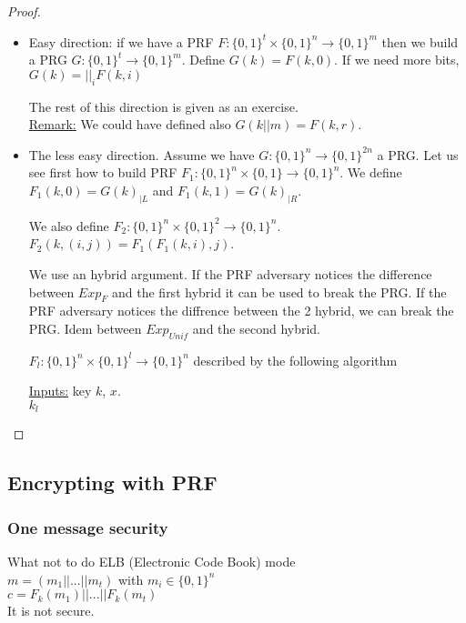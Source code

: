\documentclass{article}
\newcommand{\Rem}{\underline{Remark:} }
\newcommand{\bit}{\{0,1\}}
\begin{document}
\begin{proof}
\begin{itemize}
\item Easy direction:
if we have a PRF $F:\bit^t\times\bit^n\rightarrow\bit^m$ then we build a PRG $G:\bit^t\rightarrow\bit^m$. Define $G(k)=F(k,0)$. If we need more bits, $G(k)=||_{i}F(k,i)$

The rest of this direction is given as an exercise.\\
\Rem We could have defined also $G(k||m)=F(k,r)$.
\item The less easy direction. Assume we have $G:\bit^n\rightarrow\bit^{2n}$ a PRG. Let us see first how to build PRF $F_1:\bit^n\times\bit\rightarrow\bit^n$.
We define $F_1(k,0)=G(k)_{|L}$ and $F_1(k,1)=G(k)_{|R}$.

We also define $F_2:\bit^n\times\bit^2\rightarrow\bit^n$. $F_2(k,(i,j))=F_1(F_1(k,i),j)$.

We use an hybrid argument. If the PRF adversary notices the difference between $Exp_F$  and the first hybrid it can be used to break the PRG. If the PRF adversary notices the diffrence between the 2 hybrid, we can break the PRG.
Idem between $Exp_{Unif}$ and the second hybrid.

$F_l:\bit^n\times\bit^l\rightarrow\bit^n$ described by the following algorithm\\
\begin{algorithme}
\underline{Inputs:} key $k$, $x$.\\
\Return $k_l$
\end{algorithme}
\end{itemize}
\end{proof}

\subsection{Encrypting with PRF}
\subsubsection{One message security}
What not to do ELB (Electronic Code Book) mode\\
$m=(m_1||...||m_t)$ with $m_i\in\bit^n$\\
$c=F_k(m_1)||...||F_k(m_t)$\\ 
It is not secure.
\end{document}
